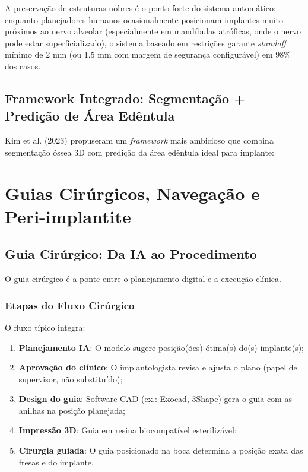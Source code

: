 A preservação de estruturas nobres é o ponto forte do sistema automático: enquanto planejadores humanos ocasionalmente posicionam implantes muito próximos ao nervo alveolar (especialmente em mandíbulas atróficas, onde o nervo pode estar superficializado), o sistema baseado em restrições garante \textit{standoff} mínimo de 2 mm (ou 1,5 mm com margem de segurança configurável) em 98\% dos casos.

\subsection{Framework Integrado: Segmentação + Predição de Área Edêntula}

Kim et al. (2023) propuseram um \textit{framework} mais ambicioso que combina segmentação óssea 3D com predição da área edêntula ideal para implante:


\section{Guias Cirúrgicos, Navegação e Peri-implantite}

\subsection{Guia Cirúrgico: Da IA ao Procedimento}

O guia cirúrgico é a ponte entre o planejamento digital e a execução clínica.

\subsubsection{Etapas do Fluxo Cirúrgico}

O fluxo típico integra:
\begin{enumerate}
    \item \textbf{Planejamento IA}: O modelo sugere posição(ões) ótima(s) do(s) implante(s);
    \item \textbf{Aprovação do clínico}: O implantologista revisa e ajusta o plano (papel de supervisor, não substituído);
    \item \textbf{Design do guia}: Software CAD (ex.: Exocad, 3Shape) gera o guia com as anilhas na posição planejada;
    \item \textbf{Impressão 3D}: Guia em resina biocompatível esterilizável;
    \item \textbf{Cirurgia guiada}: O guia posicionado na boca determina a posição exata das fresas e do implante.
\end{enumerate}

